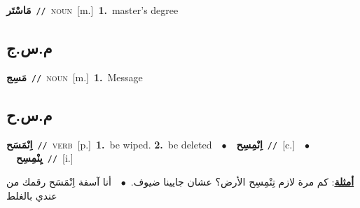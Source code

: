 \documentclass[10pt,a4paper,twoside]{article} %
\begin{document}
\begin{multicols}{2}
{\setlength\topsep{0pt}\textbf{\foreignlanguage{arabic}{مَاسْتَر}}\ {\color{gray}\texttt{//}\color{black}}\ \textsc{noun}\ [m.]\ \textbf{1.}~master's degree\ } \vspace{2mm}

\vspace{-3mm}
\subsection*{\color{blue}\foreignlanguage{arabic}{م.س.ج}\color{blue}{}} 

{\setlength\topsep{0pt}\textbf{\foreignlanguage{arabic}{مَسِج}}\ {\color{gray}\texttt{//}\color{black}}\ \textsc{noun}\ [m.]\ \textbf{1.}~Message\ } \vspace{2mm}

\vspace{-3mm}
\subsection*{\color{blue}\foreignlanguage{arabic}{م.س.ح}\color{blue}{}} 

{\setlength\topsep{0pt}\textbf{\foreignlanguage{arabic}{اِنْمَسَح}}\ {\color{gray}\texttt{//}\color{black}}\ \textsc{verb}\ [p.]\ \textbf{1.}~be wiped.  \textbf{2.}~be deleted\ \ $\bullet$\ \ \setlength\topsep{0pt}\textbf{\foreignlanguage{arabic}{اِنْمِسِح}}\ {\color{gray}\texttt{//}\color{black}}\ [c.]\ \ $\bullet$\ \ \setlength\topsep{0pt}\textbf{\foreignlanguage{arabic}{يِنْمِسِح}}\ {\color{gray}\texttt{//}\color{black}}\ [i.]\  \begin{flushright}\color{gray}\foreignlanguage{arabic}{\textbf{\underline{\foreignlanguage{arabic}{أمثلة}}}: كم مرة لازم تِنْمِسِح الأرض؟ عشان جايينا ضيوف.\ $\bullet$\ \  أنا آسفة اِنْمَسَح رقمك من عندي بالغلط}\end{flushright}\color{black}} \vspace{2mm}


\end{multicols}
\end{document}
